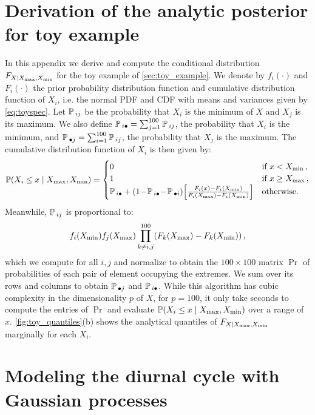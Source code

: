 \section{Derivation of the analytic posterior for toy example}
\label{sec:analytical_posterior}

In this appendix we derive and compute the conditional distribution \(F_{X \mid X_{\max},X_{\min}}\) for the toy example of \autoref{sec:toy_example}.
We denote by \(f_i(\cdot)\) and \(F_i(\cdot)\) the prior probability distribution function and cumulative distribution function of \(X_i\), i.e. the normal PDF and CDF with means and variances given by \autoref{eq:toyspec}.
Let \(\operatorname{\mathbb{P}}{}_{ij}\) be the probability that \(X_i\) is the minimum of \(X\) and \(X_j\) is its maximum.
We also define \(\operatorname{\mathbb{P}}{}_{i\bullet} = \sum_{j=1}^{100} \operatorname{\mathbb{P}}{}_{ij}\), the probability that \(X_i\) is the minimum,
and \(\operatorname{\mathbb{P}}{}_{\bullet j} = \sum_{i=1}^{100} \operatorname{\mathbb{P}}{}_{ij}\), the probability that \(X_j\) is the maximum.
The cumulative distribution function of \(X_i\) is then given by:
\begin{equation}
\Pr\del{X_i \leq x \mid \Xmax, \Xmin} =
    \begin{cases}
        0 &\text{if } x < \Xmin \,, \\
        1 &\text{if } x \geq \Xmax \,, \\
        \pxx{i}{\bullet} 
            + \del{1 \!-\! \pxx{i}{\bullet} \!-\! \pxx{\bullet}{i}}
            \sbr{\frac{F_i(x) - F_i(\Xmin) }
                 {F_i(\Xmax) - F_i(\Xmin) }
                } 
            &\text{otherwise.}\\
    \end{cases}
\end{equation}
Meanwhile, \(\operatorname{\mathbb{P}}{}_{ij}\) is proportional to:
\begin{equation}
    f_i(\Xmin)
    f_j(\Xmax)
    \prod_{k \neq i,j}^{100}
    \del{F_k(\Xmax) - F_k(\Xmin)} \,,
\end{equation}
which we compute for all \(i,j\) and normalize
to obtain the \(100 \times 100\) matrix \(\Pr\) of probabilities of each pair of element occupying the extremes.
We sum over its rows and columns to obtain \(\operatorname{\mathbb{P}}{}_{\bullet j}\) and \(\operatorname{\mathbb{P}}{}_{i\bullet}\).
While this algorithm has cubic complexity in the dimensionality \(p\) of \(X\),
for \(p=100\), it only take seconds to compute the entries of \(\Pr\) and evaluate \(\Pr\del{X_i \leq x \mid \Xmax, \Xmin}\) over a range of \(x\).
\autoref{fig:toy_quantiles}(b) shows the analytical quantiles of \(F_{X \mid X_{\max},X_{\min}}\) marginally for each \(X_i\).

\section{Modeling the diurnal cycle with Gaussian processes}
\label{appendix:diurnal_kernel}

